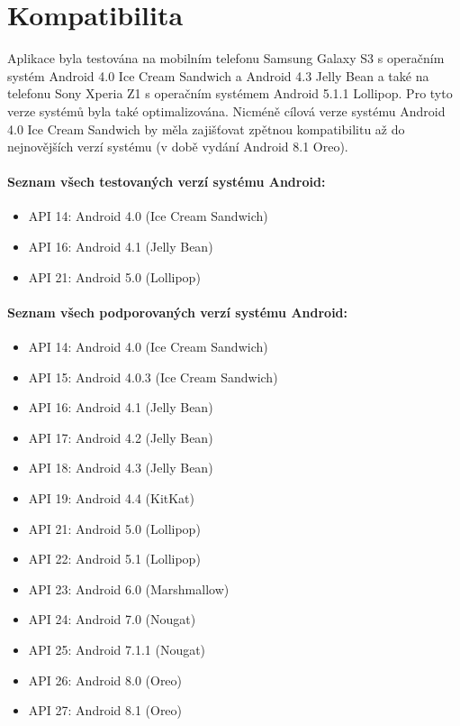 \documentclass[FM,DP]{tulthesis}  %
\begin{document}
\section{Kompatibilita}
Aplikace byla testována na mobilním telefonu Samsung Galaxy S3 s operačním systém Android 4.0 Ice Cream Sandwich a Android 4.3 Jelly Bean a také na telefonu Sony Xperia Z1 s operačním systémem Android 5.1.1 Lollipop. Pro tyto verze systémů byla také optimalizována.  Nicméně cílová verze systému Android 4.0 Ice Cream Sandwich by měla zajišťovat zpětnou kompatibilitu až do nejnovějších verzí systému (v době vydání Android 8.1 Oreo).

\paragraph{Seznam všech testovaných verzí systému Android:}
\begin{itemize}
\item API 14: Android 4.0 (Ice Cream Sandwich)
\item API 16: Android 4.1 (Jelly Bean)
\item API 21: Android 5.0 (Lollipop)
\end{itemize}

\paragraph{Seznam všech podporovaných verzí systému Android:}
\begin{itemize}
\item API 14: Android 4.0 (Ice Cream Sandwich)
\item API 15: Android 4.0.3 (Ice Cream Sandwich)
\item API 16: Android 4.1 (Jelly Bean)
\item API 17: Android 4.2 (Jelly Bean)
\item API 18: Android 4.3 (Jelly Bean)
\item API 19: Android 4.4 (KitKat)
\item API 21: Android 5.0 (Lollipop)
\item API 22: Android 5.1 (Lollipop)
\item API 23: Android 6.0 (Marshmallow)
\item API 24: Android 7.0 (Nougat)
\item API 25: Android 7.1.1 (Nougat)
\item API 26: Android 8.0 (Oreo)
\item API 27: Android 8.1 (Oreo)
\end{itemize}
\end{document}
